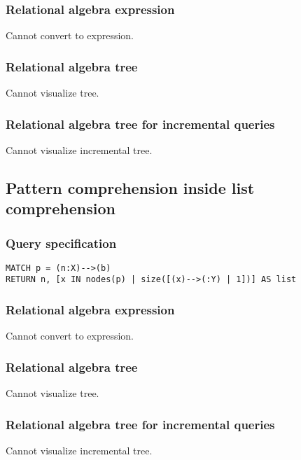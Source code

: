 \subsubsection*{Relational algebra expression}

Cannot convert to expression.

\subsubsection*{Relational algebra tree}

Cannot visualize tree.

\subsubsection*{Relational algebra tree for incremental queries}

Cannot visualize incremental tree.

\subsection{Pattern comprehension inside list comprehension}

\subsubsection*{Query specification}

\begin{lstlisting}
MATCH p = (n:X)-->(b)
RETURN n, [x IN nodes(p) | size([(x)-->(:Y) | 1])] AS list
\end{lstlisting}

\subsubsection*{Relational algebra expression}

Cannot convert to expression.

\subsubsection*{Relational algebra tree}

Cannot visualize tree.

\subsubsection*{Relational algebra tree for incremental queries}

Cannot visualize incremental tree.

